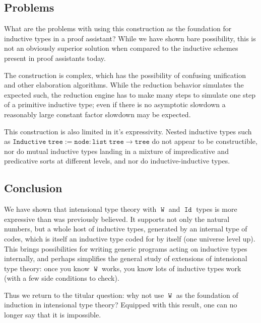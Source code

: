 \documentclass[a4paper,UKenglish,cleveref,nameinlink,autoref,thm-restate]{lipics-v2019}
\DeclareMathOperator{\W}{\mathtt{W}}
\DeclareMathOperator{\Idop}{\mathtt{Id}}
\begin{document}
\subsection{Problems}
What are the problems with using this construction as the foundation for inductive types in a proof assistant? While we have shown bare possibility, this is not an obviously superior solution when compared to the inductive schemes present in proof assistants today.

The construction is complex, which has the possibility of confusing unification and other elaboration algorithms. While the reduction behavior simulates the expected such, the reduction engine has to make many steps to simulate one step of a primitive inductive type; even if there is no asymptotic slowdown a reasonably large constant factor slowdown may be expected.

This construction is also limited in it's expressivity. Nested inductive types such as $\mathtt{Inductive}\;\mathtt{tree} := \mathtt{node} : \mathtt{list}\;\mathtt{tree} \to \mathtt{tree}$ do not appear to be constructible, nor do mutual inductive types landing in a mixture of impredicative and predicative sorts at different levels, and nor do inductive-inductive types.

\subsection{Conclusion}

We have shown that intensional type theory with $\W$ and $\Idop$ types is more expressive than was previously believed. It supports not only the natural numbers, but a whole host of inductive types, generated by an internal type of codes, which is itself an inductive type coded for by itself (one universe level up). This brings possibilities for writing generic programs acting on inductive types internally, and perhaps simplifies the general study of extensions of intensional type theory: once you know $\W$ works, you know lots of inductive types work (with a few side conditions to check).

Thus we return to the titular question: why not use $\W$ as the foundation of induction in intensional type theory? Equipped with this result, one can no longer say that it is impossible.





\appendix
\end{document}

